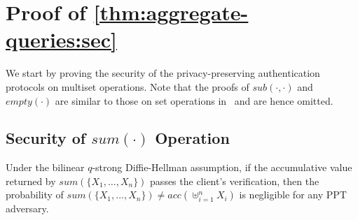 \chapter{Proof of \texorpdfstring{\cref*{thm:aggregate-queries:sec}}{Theorem~\ref{thm:aggregate-queries:sec}}}%
\label{app:aggregate-queries}

We start by proving the security of the privacy-preserving authentication protocols on multiset operations. Note that the proofs of $sub(\cdot, \cdot)$ and $empty(\cdot)$ are similar to those on set operations in~\cite{10.1007/978-3-642-22792-9_6} and are hence omitted.

\section{Security of \texorpdfstring{$sum(\cdot)$}{sum(\textcdot)} Operation}

\begin{lemma}\label{lem:aggregate-queries:sum}
  Under the bilinear $q$-strong Diffie-Hellman assumption, if the accumulative value returned by $sum(\{X_1,\dots,X_n\})$ passes the client's verification, then the probability of $sum(\{X_1,\dots,X_n\}) \neq acc(\uplus_{i=1}^n X_i)$ is negligible for any PPT adversary.
\end{lemma}

